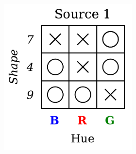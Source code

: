 \begin{dataset}
\begin{figure}[H]
        \begin{subfigure}[b]{0.45\textwidth}
            \centering
            \begin{subfigure}[b]{0.48\textwidth}
                \centering
                \includegraphics[width=\textwidth]{img/datasets/1-CGO_fact=hue_env=0.pdf}
            \end{subfigure}
            \begin{subfigure}[b]{0.48\textwidth}
                \centering

\end{subfigure}
\end{subfigure}
\end{figure}
\end{dataset}
